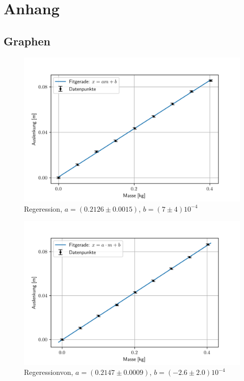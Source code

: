 \section{Anhang}
	
	\subsection{Graphen}
	\begin{figure}[!ht]
		\centering								 
		\includegraphics[width=350pt]{fotos/gpr1/B_Reg_A1_M1.png}			 
		\caption{Regeression, $ a=(0.2126\pm 0.0015) $, $ b=(7\pm 4)10^{-4} $}							 
		\label{Abb: Reg Ben A1 M1}							 
	\end{figure}
		\begin{figure}[!ht]
		\centering								 
		\includegraphics[width=350pt]{fotos/gpr1/B_Reg_A1_M2.png}			 
		\caption{Regeressionvon, $ a=(0.2147\pm 0.0009) $, $ b=(-2.6\pm 2.0)10^{-4} $}							 
		\label{Abb: Reg Ben A1 M2}							 
	\end{figure}

